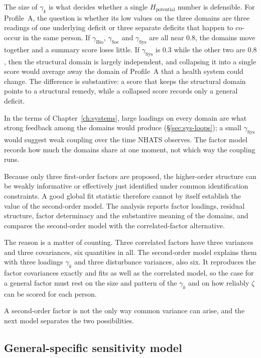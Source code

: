 The size of $\gamma_k$ is what decides whether a single $H_{\text{potential}}$
number is defensible. For Profile~A, the question is whether its low values on
the three domains are three readings of one underlying deficit or three
separate deficits that happen to co-occur in the same person. If
$\gamma_{\mathrm{Bio}}$, $\gamma_{\mathrm{Soc}}$ and $\gamma_{\mathrm{Sys}}$
are all near $0.8$, the domains move together and a summary score loses little.
If $\gamma_{\mathrm{Sys}}$ is $0.3$ while the other two are $0.8$, then the
structural domain is largely independent, and collapsing it into a single score
would average away the domain of Profile~A that a health system could change.
The difference is substantive: a score that keeps the structural domain points
to a structural remedy, while a collapsed score records only a general
deficit.

In the terms of Chapter~\ref{ch:systems}, large loadings on every domain are
what strong feedback among the domains would produce (\S\ref{sec:sys-loops});
a small $\gamma_{\mathrm{Sys}}$ would suggest weak coupling over the time NHATS
observes. The factor model records how much the domains share at one moment,
not which way the coupling runs.

Because only three first-order factors are proposed, the higher-order structure can be weakly informative or effectively just identified under common identification constraints. A good global fit statistic therefore cannot by itself establish the value of the second-order model. The analysis reports factor loadings, residual structure, factor determinacy \citep{grice_2001} and the substantive meaning of the domains, and compares the second-order model with the correlated-factor alternative.

The reason is a matter of counting. Three correlated factors have three variances and three covariances, six quantities in all. The second-order model explains them with three loadings $\gamma_k$ and three disturbance variances, also six. It reproduces the factor covariances exactly and fits as well as the correlated model, so the case for a general factor must rest on the size and pattern of the $\gamma_k$ and on how reliably $\zeta$ can be scored for each person.

A second-order factor is not the only way common variance can arise, and the next model separates the two possibilities.

\subsection{General-specific sensitivity model}

